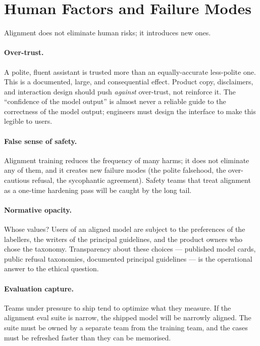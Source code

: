 \section{Human Factors and Failure Modes}

Alignment does not eliminate human risks; it introduces new ones.

\paragraph{Over-trust.}
A polite, fluent assistant is trusted more than an equally-accurate
less-polite one. This is a documented, large, and consequential
effect. Product copy, disclaimers, and interaction design should
push \emph{against} over-trust, not reinforce it. The ``confidence
of the model output'' is almost never a reliable guide to the
correctness of the model output; engineers must design the
interface to make this legible to users.

\paragraph{False sense of safety.}
Alignment training reduces the frequency of many harms; it does
not eliminate any of them, and it creates new failure modes (the
polite falsehood, the over-cautious refusal, the sycophantic
agreement). Safety teams that treat alignment as a one-time
hardening pass will be caught by the long tail.

\paragraph{Normative opacity.}
Whose values? Users of an aligned model are subject to the
preferences of the labellers, the writers of the principal
guidelines, and the product owners who chose the taxonomy.
Transparency about these choices --- published model cards, public
refusal taxonomies, documented principal guidelines --- is the
operational answer to the ethical question.

\paragraph{Evaluation capture.}
Teams under pressure to ship tend to optimize what they measure.
If the alignment eval suite is narrow, the shipped model will be
narrowly aligned. The suite must be owned by a separate team from
the training team, and the cases must be refreshed faster than
they can be memorised.

